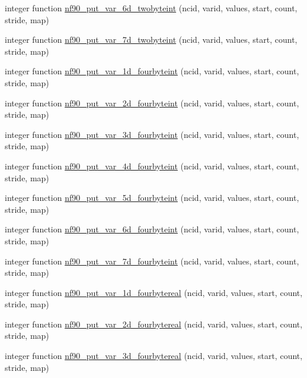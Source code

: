 \begin{DoxyCompactItemize}
\item 
integer function \hyperlink{netcdf__expanded_8f90_a38ac19c534b329e1e4d866f028700bea}{nf90\+\_\+put\+\_\+var\+\_\+6d\+\_\+twobyteint} (ncid, varid, values, start, count, stride, map)
\item 
integer function \hyperlink{netcdf__expanded_8f90_a281152c58a570d30235574463cf5258b}{nf90\+\_\+put\+\_\+var\+\_\+7d\+\_\+twobyteint} (ncid, varid, values, start, count, stride, map)
\item 
integer function \hyperlink{netcdf__expanded_8f90_a4b7dfb2e70e89cd2afb94ca46daed7c8}{nf90\+\_\+put\+\_\+var\+\_\+1d\+\_\+fourbyteint} (ncid, varid, values, start, count, stride, map)
\item 
integer function \hyperlink{netcdf__expanded_8f90_aeff9a1bf24595308b60e34792ab192b5}{nf90\+\_\+put\+\_\+var\+\_\+2d\+\_\+fourbyteint} (ncid, varid, values, start, count, stride, map)
\item 
integer function \hyperlink{netcdf__expanded_8f90_a293825f1af9d4d7e91076224ab72768e}{nf90\+\_\+put\+\_\+var\+\_\+3d\+\_\+fourbyteint} (ncid, varid, values, start, count, stride, map)
\item 
integer function \hyperlink{netcdf__expanded_8f90_a18011e84d779f3fabbbac8639343127d}{nf90\+\_\+put\+\_\+var\+\_\+4d\+\_\+fourbyteint} (ncid, varid, values, start, count, stride, map)
\item 
integer function \hyperlink{netcdf__expanded_8f90_a7a19d9c65cae04d84be097e97aac11e4}{nf90\+\_\+put\+\_\+var\+\_\+5d\+\_\+fourbyteint} (ncid, varid, values, start, count, stride, map)
\item 
integer function \hyperlink{netcdf__expanded_8f90_a5f799517352067e15b1cf6f13986f022}{nf90\+\_\+put\+\_\+var\+\_\+6d\+\_\+fourbyteint} (ncid, varid, values, start, count, stride, map)
\item 
integer function \hyperlink{netcdf__expanded_8f90_acc0d60f3dfd87872c5709daa7d63cdf1}{nf90\+\_\+put\+\_\+var\+\_\+7d\+\_\+fourbyteint} (ncid, varid, values, start, count, stride, map)
\item 
integer function \hyperlink{netcdf__expanded_8f90_ac29e46e571b90c53d69fa36d404252e9}{nf90\+\_\+put\+\_\+var\+\_\+1d\+\_\+fourbytereal} (ncid, varid, values, start, count, stride, map)
\item 
integer function \hyperlink{netcdf__expanded_8f90_a337f060e87771626a4c6407126fffc0e}{nf90\+\_\+put\+\_\+var\+\_\+2d\+\_\+fourbytereal} (ncid, varid, values, start, count, stride, map)
\item 
integer function \hyperlink{netcdf__expanded_8f90_ac726487eae2262fda92708cd55ffab5b}{nf90\+\_\+put\+\_\+var\+\_\+3d\+\_\+fourbytereal} (ncid, varid, values, start, count, stride, map)

\end{DoxyCompactItemize}
